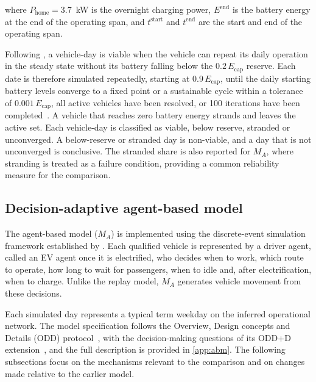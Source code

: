 \documentclass{elsarticle}
\newcommand{\MA}{\ensuremath{M_A}}
\begin{document}
\noindent where \( P_\mathrm{home} = 3.7 \)~kW is the overnight charging power, \( E^{\text{end}} \) is the battery energy at the end of the operating span, and \( t^{\text{start}} \) and \( t^{\text{end}} \) are the start and end of the operating span.

Following \citet{pretorius2024_grid_mobility_interdependence}, a vehicle-day is viable when the vehicle can repeat its daily operation in the steady state without its battery falling below the \(0.2\,E_\mathrm{cap}\) reserve. Each date is therefore simulated repeatedly, starting at \(0.9\,E_\mathrm{cap}\), until the daily starting battery levels converge to a fixed point or a sustainable cycle within a tolerance of \(0.001\,E_\mathrm{cap}\), all active vehicles have been resolved, or 100 iterations have been completed~\cite{booysen2026_cpt_embt_transition}. A vehicle that reaches zero battery energy strands and leaves the active set. Each vehicle-day is classified as viable, below reserve, stranded or unconverged. A below-reserve or stranded day is non-viable, and a day that is not unconverged is conclusive. The stranded share is also reported for \(\MA\), where stranding is treated as a failure condition, providing a common reliability measure for the comparison.

\subsection{Decision-adaptive agent-based model}
\label{sec:abm}
The agent-based model (\(\MA\)) is implemented using the discrete-event simulation framework established by \citet{sello2025_stellenbosch_embt_abm}. Each qualified vehicle is represented by a driver agent, called an EV agent once it is electrified, who decides when to work, which route to operate, how long to wait for passengers, when to idle and, after electrification, when to charge. Unlike the replay model, \(\MA\) generates vehicle movement from these decisions.

Each simulated day represents a typical term weekday on the inferred operational network. The model specification follows the Overview, Design concepts and Details (ODD) protocol~\cite{grimm2010_odd_protocol,grimm2020_odd_second_update}, with the decision-making questions of its ODD+D extension~\cite{muller2013_odd_d}, and the full description is provided in \ref{app:abm}. The following subsections focus on the mechanisms relevant to the comparison and on changes made relative to the earlier model.
\end{document}
